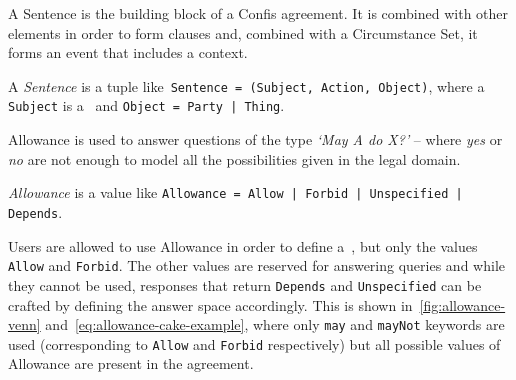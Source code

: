 A Sentence is the building block of a Confis agreement.
It is combined with other elements in order to form clauses and, combined with a Circumstance Set, it forms an event that includes a context.

\begin{definition}[Sentence]
    \label{def:sentence}
    A \emph{Sentence} is a tuple like~\texttt{Sentence = (Subject, Action, Object)}, where a \texttt{Subject} is a~ and \texttt{Object = Party | Thing}.
\end{definition}

Allowance is used to answer questions of the type \emph{`May A do X?'} -- where \emph{yes} or \emph{no} are not enough to model all the possibilities given in the legal domain.


\begin{definition}[Allowance]
    \label{def:allowance}
    \emph{Allowance} is a value like \texttt{Allowance = Allow | Forbid | Unspecified | Depends}.
\end{definition}

Users are allowed to use Allowance in order to define a~, but only the values \texttt{Allow} and \texttt{Forbid}.
The other values are reserved for answering queries and while they cannot be used, responses that return \texttt{Depends} and \texttt{Unspecified} can be crafted by defining the answer space accordingly.
This is shown in~\autoref{fig:allowance-venn} and~\autoref{eq:allowance-cake-example}, where only \texttt{may} and \texttt{mayNot} keywords are used (corresponding to \texttt{Allow} and \texttt{Forbid} respectively) but all possible values of Allowance are present in the agreement.

